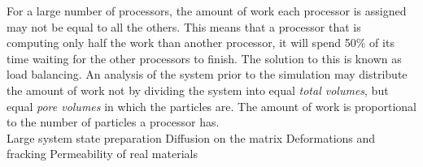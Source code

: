 For a large number of processors, the amount of work each processor is assigned may not be equal to all the others. This means that a processor that is computing only half the work than another processor, it will spend 50$\%$ of its time waiting for the other processors to finish. The solution to this is known as load balancing. An analysis of the system prior to the simulation may distribute the amount of work not by dividing the system into equal \textit{total volumes}, but equal \textit{pore volumes} in which the particles are. The amount of work is proportional to the number of particles a processor has.\\


Large system state preparation
Diffusion on the matrix
Deformations and fracking
Permeability of real materials